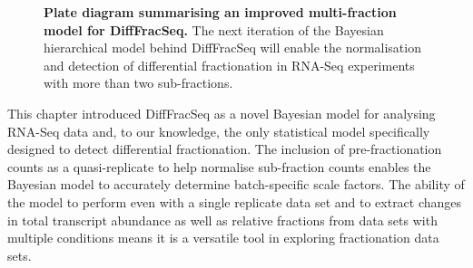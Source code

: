 \documentclass[../main.tex]{subfiles}
\begin{document}
\begin{figure} 
     \centering
     \begin{subfigure}[b]{0.53\textwidth}
     \centering
     \end{subfigure}
     \caption[Graphical representation of the multi-fraction DiffFracSeq Model.]{\textbf{Plate diagram summarising an improved multi-fraction model for DiffFracSeq.} The next iteration of the Bayesian hierarchical model behind DiffFracSeq will enable the normalisation and detection of differential fractionation in RNA-Seq experiments with more than two sub-fractions.}
     \label{fig:DiffFracQuant-future-plate-diagram}
\end{figure}

This chapter introduced DiffFracSeq as a novel Bayesian model for analysing RNA-Seq data and, to our knowledge, the only statistical model specifically designed to detect differential fractionation.
The inclusion of pre-fractionation counts as a quasi-replicate to help normalise sub-fraction counts enables the Bayesian model to accurately determine batch-specific scale factors.
The ability of the model to perform even with a single replicate data set and to extract changes in total transcript abundance as well as relative fractions from data sets with multiple conditions means it is a versatile tool in exploring fractionation data sets.
\end{document}
